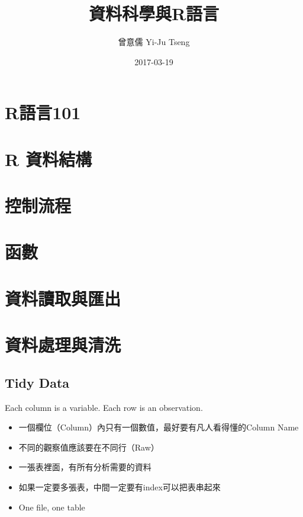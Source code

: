 \documentclass[]{book}
\title{資料科學與R語言}
\author{曾意儒 Yi-Ju Tseng}
\date{2017-03-19}
\providecommand{\tightlist}{%
  \setlength{\itemsep}{0pt}\setlength{\parskip}{0pt}}
\begin{document}
\maketitle

{
\setcounter{tocdepth}{1}
\tableofcontents
}
\chapter*{}\label{preface}

\chapter{R語言101}\label{intro}

\chapter{R 資料結構}\label{RDataStructure}

\chapter{控制流程}\label{controlstructure}

\chapter{函數}\label{function}

\chapter{資料讀取與匯出}\label{io}

\chapter{資料處理與清洗}\label{manipulation}

\section{Tidy Data}\label{tidy-data}

Each column is a variable. Each row is an observation.

\begin{itemize}
\tightlist
\item
  一個欄位（Column）內只有一個數值，最好要有凡人看得懂的Column Name
\item
  不同的觀察值應該要在不同行（Raw）
\item
  一張表裡面，有所有分析需要的資料
\item
  如果一定要多張表，中間一定要有index可以把表串起來
\item
  One file, one table
\end{itemize}
\end{document}
